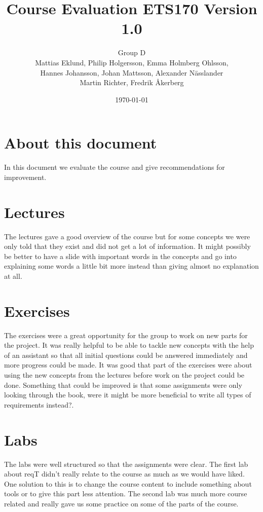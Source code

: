 \documentclass[a4paper]{article}
\title{Course Evaluation ETS170 Version 1.0}
\author{Group D\\ Mattias Eklund, Philip Holgersson, Emma Holmberg Ohlsson,\\ Hannes Johansson, Johan Mattsson, Alexander Nässlander\\Martin Richter, Fredrik Åkerberg}
\date{\today}
\begin{document}
	\maketitle
	\thispagestyle{empty}
	\pagestyle{empty}
	\newpage
	\clearpage
	\tableofcontents
	\newpage
	\setcounter{page}{1}

\pagestyle{fancy}
\renewcommand{\headrulewidth}{0.4pt}
\renewcommand{\footrulewidth}{0.4pt}


	
	\section{About this document}
	In this document we evaluate the course and give recommendations for improvement.
	
	\section{Lectures}
	The lectures gave a good overview of the course but for some concepts we were only told that they exist and did not get a lot of information. It might possibly be better to have a slide with important words in the concepts and go into explaining some words a little bit more instead than giving almost no explanation at all.

	\section{Exercises}
	The exercises were a great opportunity for the group to work on new parts for the project. It was really helpful to be able to tackle new concepts with the help of an assistant so that all initial questions could be answered immediately and more progress could be made.
	It was good that part of the exercises were about using the new concepts from the lectures before work on the project could be done.
	Something that could be improved is that some assignments were only looking through the book, were it might be more beneficial to write all types of requirements instead?.

	\section{Labs}
	The labs were well structured so that the assignments were clear. The first lab about reqT didn't really relate to the course as much as we would have liked. One solution to this is to change the course content to include something about tools or to give this part less attention. The second lab was much more course related and really gave us some practice on some of the parts of the course.
\end{document}
